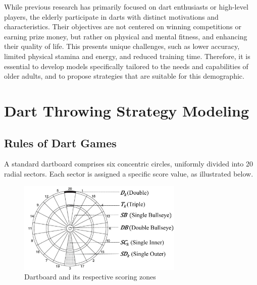 \documentclass[cjjs]{ipart}
\theoremstyle{plain}
\begin{document}
While previous research has primarily focused on dart enthusiasts or high-level players, the elderly participate in darts with distinct motivations and characteristics. Their objectives are not centered on winning competitions or earning prize money, but rather on physical and mental fitness, and enhancing their quality of life. This presents unique challenges, such as lower accuracy, limited physical stamina and energy, and reduced training time. Therefore, it is essential to develop models specifically tailored to the needs and capabilities of older adults, and to propose strategies that are suitable for this demographic.


\section{Dart Throwing Strategy Modeling}

\subsection{Rules of Dart Games}
A standard dartboard comprises six concentric circles, uniformly divided into 20 radial sectors. Each sector is assigned a specific score value, as illustrated below.


\begin{figure}
        \centering
        \includegraphics[width=0.70\textwidth]{1.png}
        \caption{Dartboard and its respective scoring zones}
        \label{fig:enter-label}
     \label{fig:dartboard}
\end{figure}
\end{document}
